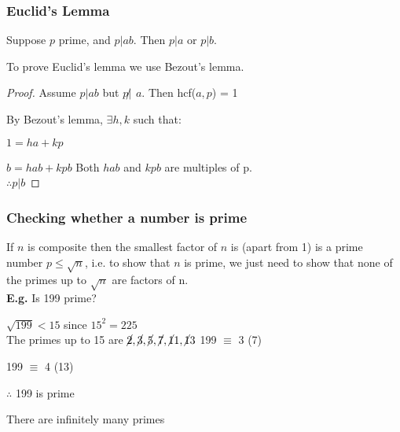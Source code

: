 \documentclass[11pt]{article}
\begin{document}
\subsubsection{Euclid's Lemma}

\begin{lemma}
Suppose $p$ prime, and $p | ab$. Then $p| a$ or $p|b$.
\end{lemma}
To prove Euclid's lemma we use Bezout's lemma.
\begin{proof}
	Assume $p|ab$ but $p\not|\hspace{5pt}a $. Then hcf($a,p$) = 1
	
	By Bezout's lemma, $\exists h,k $ such that:
	
	$1 =ha + kp$ 

	$b = hab + kpb$\hspace{50pt} Both $hab$ and $kpb$ are multiples of p. \\$\therefore p | b$
\end{proof}

\subsubsection{Checking whether a number is prime}
If $n$ is composite then the smallest factor of $n$ is (apart from 1) is a prime number $p\leq \sqrt{n}$, i.e. to show that $n$ is prime, we just need to show that none of the primes up to $\sqrt{n}$ are factors of n.\\
\textbf{E.g.} Is 199 prime? 

$\sqrt{199} < 15$ since $15^2 = 225$\\
The primes up to 15 are $\cancel 2,\cancel 3,\cancel 5,\cancel 7,\cancel 11,\cancel 13$\hspace{20pt} 199 $\equiv$ 3\hspace{7pt} (7)

\hspace{190pt} 199 $\equiv $ 4\hspace{7pt} (13) 

\hspace{190pt} $\therefore$ 199 is prime

\begin{theorem}
There are infinitely many primes
\end{theorem}
\end{document}
